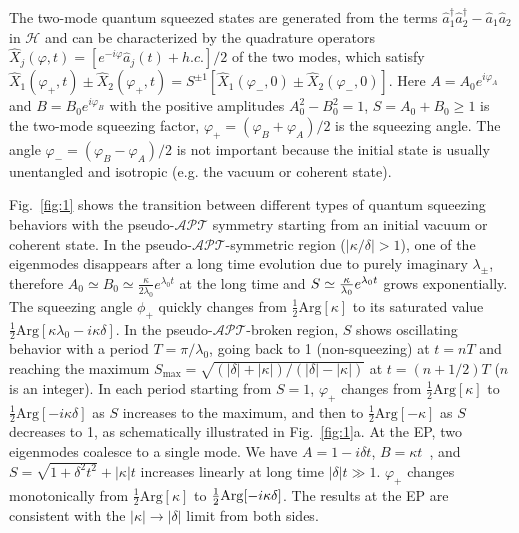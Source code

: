 \documentclass[twocolumn,prl,floatfix,citeautoscript,nofootinbib,superscriptaddress]{revtex4}
\begin{document}
The two-mode quantum squeezed states are generated from the terms $\hat{a}%
_{1}^{\dag }\hat{a}_{2}^{\dag }-\hat{a}_{1}\hat{a}_{2}$ in $\mathcal{H}$ and
can be characterized by the quadrature operators $\hat{X}_{j}(\varphi
,t)=[e^{-i\varphi }\hat{a}_{j}(t)+h.c.]/2$ of the two modes, which satisfy $%
\hat{X}_{1}(\varphi _{+},t)\pm \hat{X}_{2}(\varphi _{+},t)=S^{\pm 1}[\hat{X}%
_{1}(\varphi _{-},0)\pm \hat{X}_{2}(\varphi _{-},0)]$. Here $%
A=A_{0}e^{i\varphi _{A}}$ and $B=B_{0}e^{i\varphi _{B}}$ with the positive
amplitudes $A_{0}^{2}-B_{0}^{2}=1$, $S=A_{0}+B_{0}\geq 1$ is the two-mode
squeezing factor, $\varphi _{+}=(\varphi _{B}+\varphi _{A})/2$ is the
squeezing angle. The angle $\varphi _{-}=(\varphi _{B}-\varphi _{A})/2$ is
not important because the initial state is usually unentangled and isotropic
(e.g. the vacuum or coherent state).

Fig.~\ref{fig:1} shows the transition between different types of quantum
squeezing behaviors with the pseudo-$\mathcal{APT}$ symmetry starting from
an initial vacuum or coherent state. %
In the pseudo-$\mathcal{APT}$-symmetric region ($|\kappa /\delta |>1$), one
of the eigenmodes disappears after a long time evolution due to purely
imaginary $\lambda _{\pm }$, therefore $A_{0}\simeq B_{0}\simeq \frac{\kappa
}{2\lambda _{0}}e^{\lambda _{0}t}$ at the long time and $S\simeq \frac{%
\kappa }{\lambda _{0}}e^{\lambda _{0}t}$ grows exponentially. The squeezing
angle $\phi _{+}$ quickly changes from $\frac{1}{2}\mathrm{Arg}[\kappa ]$ to
its saturated value $\frac{1}{2}\mathrm{Arg}[\kappa \lambda _{0}-i\kappa
\delta ]$. In the pseudo-$\mathcal{APT}$-broken region, $S$ shows
oscillating behavior with a period $T=\pi /\lambda _{0}$, going back to 1
(non-squeezing) at $t=nT$ and reaching the maximum $S_{\max }=\sqrt{(|\delta
|+|\kappa |)/(|\delta |-|\kappa |)}$ at $t=(n+1/2)T$ ($n$ is an integer). In
each period starting from $S=1$, $\varphi _{+}$ changes from $\frac{1}{2}%
\mathrm{Arg}[\kappa ]$ to $\frac{1}{2}\mathrm{Arg}[-i\kappa \delta ]$ as $S$
increases to the maximum, and then to $\frac{1}{2}\mathrm{Arg}[-\kappa ]$ as
$S$ decreases to 1, as schematically illustrated in Fig.~\ref{fig:1}a. At
the EP, two eigenmodes coalesce to a single mode. We have $A=1-i\delta t$, $%
B=\kappa t$~\cite{SM}, and $S=\sqrt{1+\delta ^{2}t^{2}}+|\kappa |t$
increases linearly at long time $|\delta |t\gg 1$. $\varphi _{+}$ changes
monotonically from $\frac{1}{2}\mathrm{Arg}[\kappa ]$ to $\frac{1}{2}\mathrm{%
Arg}[-i\kappa \delta ]$. The results at the EP are consistent with the $%
|\kappa |\rightarrow |\delta |$ limit from both sides.
\end{document}
